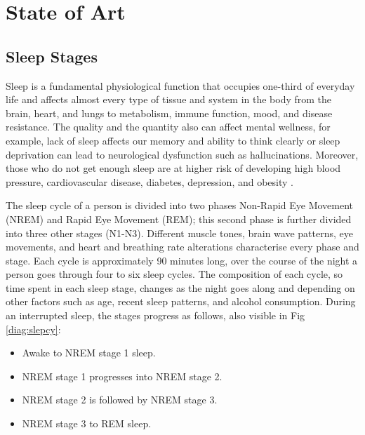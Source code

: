 \chapter{State of Art}
\section{Sleep Stages}
\begin{comment}
For this reason, it is nowadays 
acceptable to use cardiorespiratory polysomnography that does not track neurophysiological variables. This type of polysomnography
involves a cannula, chest belts and electrodes for an electrocardiogram (ECG) but does not involve an electroencephalogram (EEG).
Another reason why this kind of instrument is widely used is that inside the population, we have a higher percentage of 
sleep-related breathing disorders that can be studied and monitored with this instrument, like sleep apnoea/hypopnoea syndrome (SAS), 
where the individuals experience a collapse 
of the airway in deeper sleep states. The ability to monitor it allows for a faster and closer intervention in severe cases. \end{comment}

Sleep is a fundamental physiological function that occupies one-third of everyday life and affects almost every type of tissue and system in the body from the brain, heart, and lungs to metabolism, immune function, mood, and disease resistance. The quality and the quantity also can affect mental wellness, for example, lack of sleep affects our memory and ability to think clearly or sleep deprivation can lead to neurological dysfunction such as hallucinations. Moreover, those who do not get enough sleep are at higher risk of developing high blood pressure, cardiovascular disease, diabetes, depression, and obesity \cite{Colten2006SleepProblem}.

The sleep cycle of a person is divided into two phases Non-Rapid Eye Movement (NREM) and Rapid Eye Movement (REM); 
this second phase is further divided into three other stages (N1-N3). 
Different muscle tones, brain wave patterns, eye movements, and heart and breathing rate alterations characterise every phase and stage. Each cycle is approximately 90 minutes long, over the course of the night a person goes through four to six 
sleep cycles\cite{Patel2022PhysiologyStages}. The composition of each cycle, so time spent in each sleep stage, changes as the night goes along and depending on other factors such as age, recent sleep patterns, and alcohol consumption. 
During an interrupted sleep, the stages progress as follows, also visible in Fig \ref{diag:slepcy}:
\begin{itemize}
    \item Awake to NREM stage 1 sleep.
    \item NREM stage 1 progresses into NREM stage 2.
    \item NREM stage 2 is followed by NREM stage 3.
    \item NREM stage 3 to REM sleep.  
\end{itemize}


